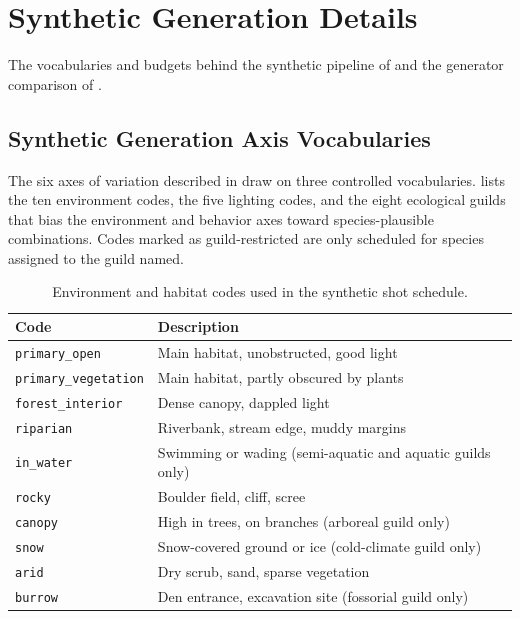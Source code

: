 \section{Synthetic Generation Details}\label{sec:appendix_synthetic_details}

The vocabularies and budgets behind the synthetic pipeline of  and the generator comparison of .

\subsection{Synthetic Generation Axis Vocabularies}\label{sec:appendix_generation_axes}

The six axes of variation described in  draw on three controlled vocabularies.  lists the ten environment codes,  the five lighting codes, and  the eight ecological guilds that bias the environment and behavior axes toward species-plausible combinations. Codes marked as guild-restricted are only scheduled for species assigned to the guild named.

\begin{table}[htbp]
\centering
\caption{Environment and habitat codes used in the synthetic shot schedule.}
\label{tab:appendix-environment-codes}
\begin{tabularx}{\textwidth}{@{}lX@{}}
\toprule
Code & Description \\
\midrule
\texttt{primary\_open} & Main habitat, unobstructed, good light \\
\texttt{primary\_vegetation} & Main habitat, partly obscured by plants \\
\texttt{forest\_interior} & Dense canopy, dappled light \\
\texttt{riparian} & Riverbank, stream edge, muddy margins \\
\texttt{in\_water} & Swimming or wading (semi-aquatic and aquatic guilds only) \\
\texttt{rocky} & Boulder field, cliff, scree \\
\texttt{canopy} & High in trees, on branches (arboreal guild only) \\
\texttt{snow} & Snow-covered ground or ice (cold-climate guild only) \\
\texttt{arid} & Dry scrub, sand, sparse vegetation \\
\texttt{burrow} & Den entrance, excavation site (fossorial guild only) \\
\bottomrule
\end{tabularx}
\end{table}

